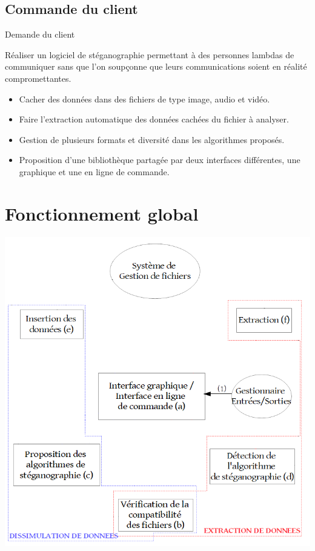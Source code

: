 \documentclass{beamer}
\begin{document}
      \subsection{Commande du client}
  
  \begin{frame}
   \begin{block}{Demande du client}
   
	Réaliser un logiciel de stéganographie permettant à des
	personnes lambdas de communiquer sans que l'on soupçonne que leurs
	communications soient en réalité compromettantes. 
   
	\begin{itemize}
	[circle]
    \item Cacher des données dans des fichiers
        de type image, audio et vidéo. 
    \item Faire l'extraction automatique des données cachées du 
        fichier à analyser.
    \item Gestion de plusieurs formats et diversité dans les algorithmes proposés.
    \item Proposition d'une bibliothèque partagée par
        deux interfaces différentes, une graphique et une en ligne de commande.
	\end{itemize}
	\end{block}

  \end{frame}
  

  \section{Fonctionnement global} 
    
  \begin{frame}
  \hspace{1.5cm}
  \includegraphics[scale=0.35]{pictures/organigramme_vide.png}
  \end{frame}
  
\end{document}
